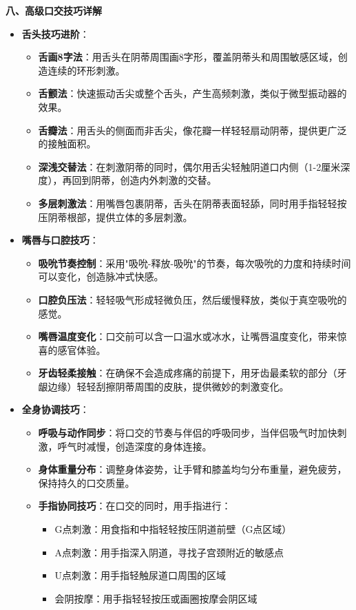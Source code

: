 \documentclass[12pt,UTF8]{ctexbook}
\begin{document}
  \textbf{八、高级口交技巧详解}
  \begin{itemize}
  \item \textbf{舌头技巧进阶}：
    \begin{itemize}
    \item \textbf{舌画8字法}：用舌头在阴蒂周围画8字形，覆盖阴蒂头和周围敏感区域，创造连续的环形刺激。
    \item \textbf{舌颤法}：快速振动舌尖或整个舌头，产生高频刺激，类似于微型振动器的效果。
    \item \textbf{舌瓣法}：用舌头的侧面而非舌尖，像花瓣一样轻轻扇动阴蒂，提供更广泛的接触面积。
    \item \textbf{深浅交替法}：在刺激阴蒂的同时，偶尔用舌尖轻触阴道口内侧（1-2厘米深度），再回到阴蒂，创造内外刺激的交替。
    \item \textbf{多层刺激法}：用嘴唇包裹阴蒂，舌头在阴蒂表面轻舔，同时用手指轻轻按压阴蒂根部，提供立体的多层刺激。
    \end{itemize}
  \item \textbf{嘴唇与口腔技巧}：
    \begin{itemize}
    \item \textbf{吸吮节奏控制}：采用"吸吮-释放-吸吮"的节奏，每次吸吮的力度和持续时间可以变化，创造脉冲式快感。
    \item \textbf{口腔负压法}：轻轻吸气形成轻微负压，然后缓慢释放，类似于真空吸吮的感觉。
    \item \textbf{嘴唇温度变化}：口交前可以含一口温水或冰水，让嘴唇温度变化，带来惊喜的感官体验。
    \item \textbf{牙齿轻柔接触}：在确保不会造成疼痛的前提下，用牙齿最柔软的部分（牙龈边缘）轻轻刮擦阴蒂周围的皮肤，提供微妙的刺激变化。
    \end{itemize}
  \item \textbf{全身协调技巧}：
    \begin{itemize}
    \item \textbf{呼吸与动作同步}：将口交的节奏与伴侣的呼吸同步，当伴侣吸气时加快刺激，呼气时减慢，创造深度的身体连接。
    \item \textbf{身体重量分布}：调整身体姿势，让手臂和膝盖均匀分布重量，避免疲劳，保持持久的口交质量。
    \item \textbf{手指协同技巧}：在口交的同时，用手指进行：
      \begin{itemize}
      \item G点刺激：用食指和中指轻轻按压阴道前壁（G点区域）
      \item A点刺激：用手指深入阴道，寻找子宫颈附近的敏感点
      \item U点刺激：用手指轻触尿道口周围的区域
      \item 会阴按摩：用手指轻轻按压或画圈按摩会阴区域
      \end{itemize}
    \end{itemize}
  \end{itemize}
\end{document}
